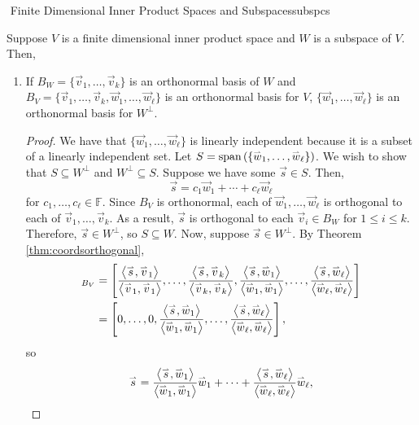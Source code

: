         \pagebreak
        \begin{theorem}{\Stop\,\,Finite Dimensional Inner Product Spaces and Subspaces}{subspcs}
            
            Suppose \(V\) is a finite dimensional inner product space and \(W\) is a subspace of \(V\). Then,
            \begin{enumerate}
                \item If \(B_W=\{\vec{v}_1,\ldots,\vec{v}_k\}\) is an orthonormal basis of \(W\) and \(B_V=\{\vec{v}_1,\ldots,\vec{v}_k,\vec{w}_1,\ldots,\vec{w}_{\ell}\}\) is an orthonormal basis for \(V\), \(\{\vec{w}_1,\ldots,\vec{w}_{\ell}\}\) is an orthonormal basis for \(W^\perp\).
                \begin{proof}
                    We have that \(\{\vec{w}_1,\ldots,\vec{w}_\ell\}\) is linearly independent because it is a subset of a linearly independent set. Let \(S=\text{span\,}(\{\overset{_{\rightharpoonup}}{w}_1,\ldots,\overset{_{\rightharpoonup}}{w}_\ell\})\). We wish to show that \(S\subseteq W^\perp\) and \(W^\perp\subseteq S\). Suppose we have some \(\vec{s}\in S\). Then,
                    \begin{equation*}
                        \vec{s}=c_1\vec{w}_1+\cdots+c_\ell\vec{w}_\ell
                    \end{equation*}
                    for \(c_1,\ldots,c_\ell\in\mathbb{F}\). Since \(B_V\) is orthonormal, each of \(\vec{w}_1,\ldots,\vec{w}_\ell\) is orthogonal to each of \(\vec{v}_1,\ldots,\vec{v}_k\). As a result, \(\vec{s}\) is orthogonal to each \(\vec{v}_i\in B_W\) for \(1\leq i \leq k\). Therefore, \(\vec{s}\in W^\perp\), so \(S\subseteq W\). Now, suppose \(\vec{s}\in W^\perp\). By Theorem \ref{thm:coordsorthogonal}, 
                    \begin{align*}
                        [\vec{s}]_{B_V}&=\left[\frac{\iprod{\vec{s}}{\vec{v}_1}}{\iprod{\vec{v}_1}{\vec{v}_1}},\ldots,\frac{\iprod{\vec{s}}{\vec{v}_k}}{\iprod{\vec{v}_k}{\vec{v}_k}},\frac{\iprod{\vec{s}}{\vec{w}_1}}{\iprod{\vec{w}_1}{\vec{w}_1}},\ldots,\frac{\iprod{\vec{s}}{\vec{w}_\ell}}{\iprod{\vec{w}_\ell}{\vec{w}_\ell}}\right] \\
                        &=\left[0,\ldots,0,\frac{\iprod{\vec{s}}{\vec{w}_1}}{\iprod{\vec{w}_1}{\vec{w}_1}},\ldots,\frac{\iprod{\vec{s}}{\vec{w}_\ell}}{\iprod{\vec{w}_\ell}{\vec{w}_\ell}}\right],
                    \end{align*}
                    so
                    \begin{equation*}
                        \vec{s}=\frac{\iprod{\vec{s}}{\vec{w}_1}}{\iprod{\vec{w}_1}{\vec{w}_1}}\vec{w}_1+\cdots+\frac{\iprod{\vec{s}}{\vec{w}_\ell}}{\iprod{\vec{w}_\ell}{\vec{w}_\ell}}\vec{w}_\ell,

\end{equation*}
\end{proof}
\end{enumerate}
\end{theorem}
